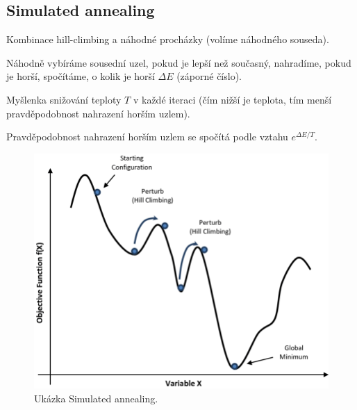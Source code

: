 \subsection{Simulated annealing}

\begin{compactitem}
    \item Kombinace hill-climbing a náhodné procházky (volíme náhodného souseda).
    \item Náhodně vybíráme sousední uzel, pokud je lepší než současný, nahradíme, pokud je horší, spočítáme, o kolik je horší $\Delta E$ (záporné číslo).
    \item Myšlenka snižování teploty $T$ v každé iteraci (čím nižší je teplota, tím menší pravděpodobnost nahrazení horším uzlem).
    \item Pravděpodobnost nahrazení horším uzlem se spočítá podle vztahu $e^{\Delta E / T}$.

    \begin{figure}[H]
        \centering
        \includegraphics[width=1\linewidth]{simulated_annealing.png}
        \caption{Ukázka Simulated annealing.}
    \end{figure}
\end{compactitem}



